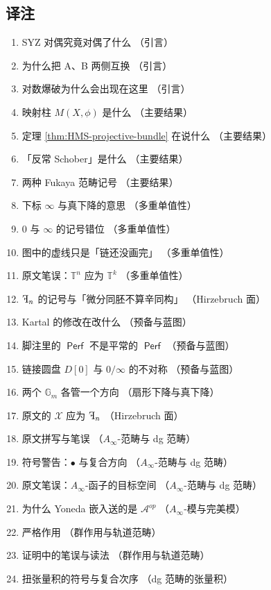 \documentclass[11pt,a4paper]{article}
\DeclareMathOperator{\Perf}{\mathsf{Perf}}
\DeclareMathOperator{\rF}{\reflectbox{F}}
\theoremstyle{cnth}
\begin{document}
\subsection*{译注}
\begin{enumerate}[label={译注 \arabic*：},leftmargin=2.8cm,itemsep=1pt]
\item SYZ 对偶究竟对偶了什么 \quad（引言）
\item 为什么把 A、B 两侧互换 \quad（引言）
\item 对数爆破为什么会出现在这里 \quad（引言）
\item 映射柱 $M(X,\phi)$ 是什么 \quad（主要结果）
\item 定理 \ref{thm:HMS-projective-bundle} 在说什么 \quad（主要结果）
\item 「反常 Schober」是什么 \quad（主要结果）
\item 两种 Fukaya 范畴记号 \quad（主要结果）
\item 下标 $\infty$ 与真下降的意思 \quad（多重单值性）
\item $0$ 与 $\infty$ 的记号错位 \quad（多重单值性）
\item 图中的虚线只是「链还没画完」 \quad（多重单值性）
\item 原文笔误：$\mathbb{T}^n$ 应为 $\mathbb{T}^k$ \quad（多重单值性）
\item $\rF_n$ 的记号与「微分同胚不算辛同构」 \quad（Hirzebruch 面）
\item Kartal 的修改在改什么 \quad（预备与蓝图）
\item 脚注里的 $\Perf$ 不是平常的 $\Perf$ \quad（预备与蓝图）
\item 链接圆盘 ${D[0]}$ 与 $0/\infty$ 的不对称 \quad（预备与蓝图）
\item 两个 $\mathbb{G}_m$ 各管一个方向 \quad（扇形下降与真下降）
\item 原文的 $\mathcal{X}$ 应为 $\rF_n$ \quad（Hirzebruch 面）
\item 原文拼写与笔误 \quad（$A_{\infty}$-范畴与 dg 范畴）
\item 符号警告：$\bullet$ 与复合方向 \quad（$A_{\infty}$-范畴与 dg 范畴）
\item 原文笔误：$A_{\infty}$-函子的目标空间 \quad（$A_{\infty}$-范畴与 dg 范畴）
\item 为什么 Yoneda 嵌入送的是 $\mathcal{A}^{op}$ \quad（$A_{\infty}$-模与完美模）
\item 严格作用 \quad（群作用与轨道范畴）
\item 证明中的笔误与读法 \quad（群作用与轨道范畴）
\item 扭张量积的符号与复合次序 \quad（dg 范畴的张量积）

\end{enumerate}
\end{document}
